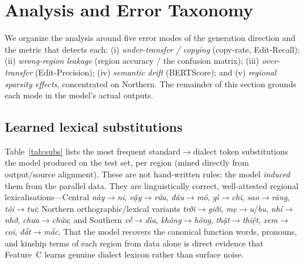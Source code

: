 \documentclass[11pt]{article}
\begin{document}
\section{Analysis and Error Taxonomy}
\label{sec:analysis}

We organize the analysis around five error modes of the generation direction and
the metric that detects each: (i) \emph{under-transfer / copying} (copy-rate,
Edit-Recall); (ii) \emph{wrong-region leakage} (region accuracy / the confusion
matrix); (iii) \emph{over-transfer} (Edit-Precision); (iv) \emph{semantic drift}
(BERTScore); and (v) \emph{regional sparsity effects}, concentrated on Northern.
The remainder of this section grounds each mode in the model's actual outputs.

\subsection{Learned lexical substitutions}
\label{sec:analysis-subs}

Table~\ref{tab:subs} lists the most frequent standard$\rightarrow$dialect token
substitutions the model produced on the test set, per region (mined directly from
output/source alignment). These are not hand-written rules: the model
\emph{induced} them from the parallel data. They are linguistically correct,
well-attested regional lexicalisations---Central \emph{này}$\rightarrow$\emph{ni},
\emph{vậy}$\rightarrow$\emph{rứa}, \emph{đâu}$\rightarrow$\emph{mô},
\emph{gì}$\rightarrow$\emph{chi}, \emph{sao}$\rightarrow$\emph{răng},
\emph{tôi}$\rightarrow$\emph{tui}; Northern orthographic/lexical variants
\emph{trời}$\rightarrow$\emph{giời}, \emph{mẹ}$\rightarrow$\emph{u}/\emph{bu},
\emph{nhỉ}$\rightarrow$\emph{nhở}, \emph{chưa}$\rightarrow$\emph{chửa}; and Southern
\emph{về}$\rightarrow$\emph{dìa}, \emph{không}$\rightarrow$\emph{hông},
\emph{thật}$\rightarrow$\emph{thiệt}, \emph{xem}$\rightarrow$\emph{coi},
\emph{đắt}$\rightarrow$\emph{mắc}. That the model recovers the canonical function
words, pronouns, and kinship terms of each region from data alone is direct
evidence that Feature~C learns genuine dialect lexicon rather than surface noise.
\end{document}
